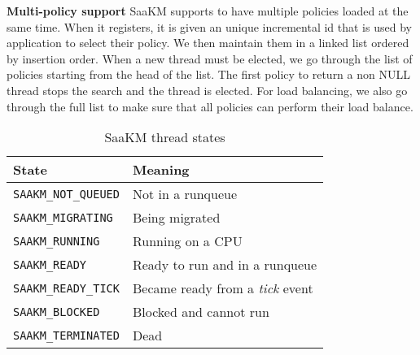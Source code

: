 \par \textbf{Multi-policy support} SaaKM supports to have multiple policies loaded at the same time. When it registers, it is given an unique incremental id that is used by application to select their policy. We then maintain them in a linked list ordered by insertion order. When a new thread must be elected, we go through the list of policies starting from the head of the list. The first policy to return a non NULL thread stops the search and the thread is elected. For load balancing, we also go through the full list to make sure that all policies can perform their load balance.
\begin{table}[htbp]
        \caption{SaaKM thread states}
        \begin{tabular}{|l|l|}
        \hline
        \textbf{State} & \textbf{Meaning} \\
                \hline
                \texttt{SAAKM\_NOT\_QUEUED} & Not in a runqueue \\
                \hline
                \texttt{SAAKM\_MIGRATING} & Being migrated \\
                \hline
                \texttt{SAAKM\_RUNNING} & Running on a CPU \\
                \hline
                \texttt{SAAKM\_READY} & Ready to run and in a runqueue \\
                \hline
                \texttt{SAAKM\_READY\_TICK} & Became ready from a \textit{tick} event \\
                \hline
                \texttt{SAAKM\_BLOCKED} & Blocked and cannot run \\
                \hline
                \texttt{SAAKM\_TERMINATED} & Dead \\
                \hline
        \end{tabular}
        
\label{tab:saakm-states}
\end{table}


